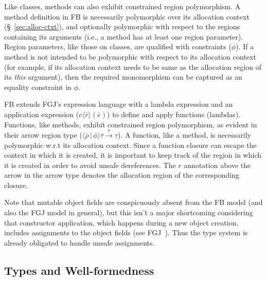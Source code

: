 \documentclass[a4paper,UKenglish]{lipics-v2018}
\newcommand{\FB}{{\sc FB}\xspace}
\newcommand{\inang}[1]{\langle #1 \rangle}
\newcommand{\rhobar}{\bar{\rho}}
\newcommand{\rgn}{r}
\newcommand{\rbar}{\bar{\rgn}}
\renewcommand{\bar}[1]{\overline{#1}}
\begin{document}
Like classes, methods can also exhibit constrained region
polymorphism.  A method definition in \FB is necessarily polymorphic
over its allocation context (\S~\ref{sec:alloc-ctxt}), and optionally
polymorphic with respect to the regions containing its arguments
(i.e., a method has at least one region parameter). Region parameters,
like those on classes, are qualified with constraints ($\phi$).  If a
method is not intended to be polymorphic with respect to its
allocation context (for example, if its allocation context needs to be
same as the allocation region of its \emph{this} argument), then the
required monomorphism can be captured as an equality constraint in
$\phi$.  

\FB extends FGJ's expression language with a lambda expression and an
application expression ($e\inang{\rbar}(\bar{e})$) to define and apply
functions (lambdas). Functions, like methods, exhibit constrained
region polymorphism, as evident in their arrow region type
($\inang{\rhobar \,|\, \phi}\bar{\tau} \xrightarrow{\rgn} \tau$).  A
function, like a method, is necessarily polymorphic w.r.t its
allocation context.  Since a function closure can escape the context
in which it is created, it is important to keep track of the region in
which it is created in order to avoid unsafe dereferences. The $\rgn$
annotation above the arrow in the arrow type denotes the allocation
region of the corresponding closure. 

Note that mutable object fields are conspicuously absent from the \FB
model (and also the FGJ model in general), but this isn't a major
shortcoming considering that constructor application, which happens
during a new object creation, includes assignments to the object
fields (see FGJ~\cite{fgj}). Thus the type system is already obligated
to handle unsafe assignments.

\subsection{Types and Well-formedness}
\end{document}
